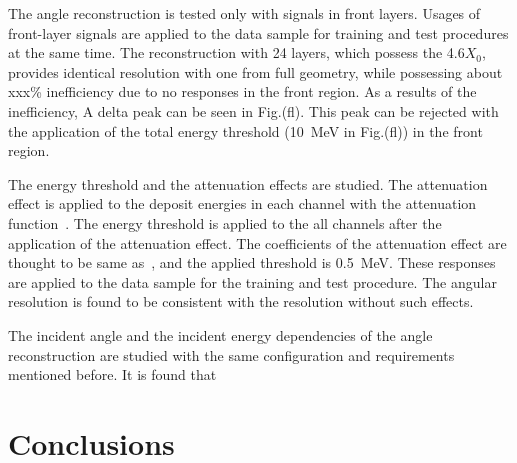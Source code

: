 \documentclass[jkps,preprint,fleqn,showpacs,showkeys]{revtex4}
\begin{document}
The angle reconstruction is tested only with signals in front layers. Usages of front-layer signals are applied to the data sample for training and test procedures at the same time. The reconstruction with 24 layers, which possess the 4.6$X_{0}$, provides identical resolution with one from full geometry, while possessing about xxx\% inefficiency due to no responses in the front region. As a results of the inefficiency, A delta peak can be seen in Fig.(fl). This peak can be rejected with the application of the total energy threshold (10~MeV in Fig.(fl)) in the front region.

The energy threshold and the attenuation effects are studied. The attenuation effect is applied to the deposit energies in each channel with the attenuation function~\cite{Murayama:2020mcp}. The energy threshold is applied to the all channels after the application of the attenuation effect. The coefficients of the attenuation effect are thought to be same as~\cite{Murayama:2020mcp}, and the applied threshold is 0.5~MeV. These responses are applied to the data sample for the training and test procedure. The angular resolution is found to be consistent with the resolution without such effects.

The incident angle and the incident energy dependencies of the angle reconstruction are studied with the same configuration and requirements mentioned before. It is found that 




\section{Conclusions}

\label{sec:con}



\begin{acknowledgments}
\end{acknowledgments}


\end{document}
